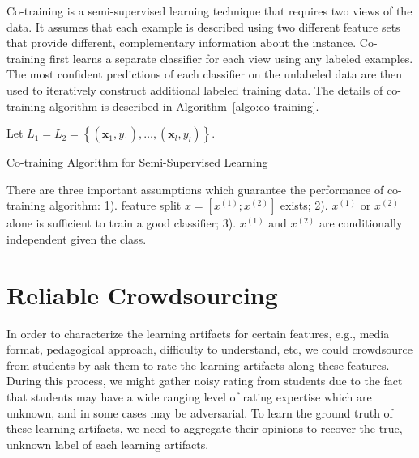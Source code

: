 \documentclass{article}
\begin{document}
Co-training \cite{blum1998combining} is a semi-supervised learning technique that requires two
views of the data. It assumes that each example is described using two
different feature sets that provide different, complementary
information about the instance. Co-training first learns a separate
classifier for each view using any labeled examples. The most
confident predictions of each classifier on the unlabeled data are
then used to iteratively construct additional labeled training
data. The details of co-training algorithm is described in Algorithm~\ref{algo:co-training}.
\begin{algorithm}[h] \label{algo:co-training}
Let $L_1 = L_2 = \left \{ (\mathbf{x}_1, y_1), \ldots, (\mathbf{x}_l, y_l)
\right \}.$ \\

\caption{Co-training Algorithm for Semi-Supervised Learning}
\end{algorithm}

There are three important assumptions which guarantee the performance of
co-training algorithm: 1). feature split $x=[x^{(1)};x^{(2)}]$
exists; 2). $x^{(1)}$ or $x^{(2)}$ alone is sufficient to train a good
classifier; 3). $x^{(1)}$ and $x^{(2)}$ are conditionally independent
given the class.

\section{Reliable Crowdsourcing}
In order to characterize the learning artifacts for certain features,
e.g., media format, pedagogical approach, difficulty to understand,
etc, we could crowdsource from students by ask them to rate the
learning artifacts along these features. During this process, we might
gather noisy rating from students due to the fact that students may
have a wide ranging level of rating expertise which are unknown, and
in some cases may be adversarial. To learn the ground truth of these
learning artifacts, we need to aggregate their opinions to recover the
true, unknown label of each learning artifacts.
\end{document}
